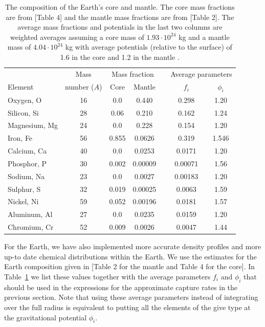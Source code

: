 \documentclass[a4paper,10pt,oneside]{book}
\begin{document}
\begin{table}
  \centering 
  \begin{tabular}{lcccccc}
& Mass & \multicolumn{2}{c}{Mass fraction} & & \multicolumn{2}{c}{Average parameters}
\\ \cline{3-4} \cline{6-7}
 Element & number ($A$) & Core & Mantle & & $f_i$ & $\phi_i$ \\ \hline
  Oxygen, O     & 16 & 0.0   & 0.440   & & 0.298   & 1.20  \\
  Silicon, Si   & 28 & 0.06  & 0.210   & & 0.162   & 1.24  \\
  Magnesium, Mg & 24 & 0.0   & 0.228   & & 0.154   & 1.20  \\
  Iron, Fe      & 56 & 0.855 & 0.0626  & & 0.319   & 1.546 \\
  Calcium, Ca   & 40 & 0.0   & 0.0253  & & 0.0171  & 1.20  \\
  Phosphor, P   & 30 & 0.002 & 0.00009 & & 0.00071 & 1.56  \\
  Sodium, Na    & 23 & 0.0   & 0.0027  & & 0.00183 & 1.20  \\
  Sulphur, S    & 32 & 0.019 & 0.00025 & & 0.0063  & 1.59  \\
  Nickel, Ni    & 59 & 0.052 & 0.00196 & & 0.0181  & 1.57  \\
  Aluminum, Al  & 27 & 0.0   & 0.0235  & & 0.0159  & 1.20  \\
  Chromium, Cr  & 52 & 0.009 & 0.0026  & & 0.0047  & 1.44  \\ \hline
\end{tabular}
  \caption{The composition of the Earth's core and mantle. The core
    mass fractions are from \cite{2003TrGeo...2..547M}[Table 4] and the mantle
    mass fractions are from \cite{2003TrGeo...2..547M}[Table 2]. The average
    mass fractions and potentials in the last two columns are weighted
    averages assuming a core mass of $1.93\cdot10^{24}$ kg and a
    mantle mass of $4.04\cdot10^{24}$ kg with average potentials
    (relative to the surface) of 1.6 in the core and 1.2 in the mantle
    \cite{Gould:1987ir}.} \label{tab:earthcomp} 
\end{table}

For the Earth, we have also implemented more accurate
density profiles and more up-to date chemical distributions within the
Earth. We use the estimates for the Earth composition given in
\cite{2003TrGeo...2..547M}[Table 2 for the mantle and Table 4 for the core]. In
Table~\ref{tab:earthcomp} we list these values together with the
average parameters $f_i$ and $\phi_i$ that should be used in the
expressions for the approximate capture rates in the previous
section. Note that using these average parameters instead of
integrating over the full radius is equivalent to putting all the
elements of the give type at the gravitational potential $\phi_i$.
\end{document}
